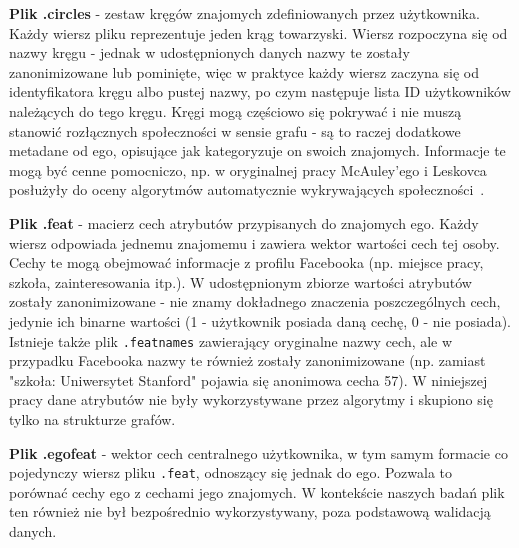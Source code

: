 \textbf{Plik .circles} - zestaw kręgów znajomych zdefiniowanych przez użytkownika. Każdy wiersz pliku reprezentuje jeden krąg towarzyski. Wiersz rozpoczyna się od nazwy kręgu - jednak w udostępnionych danych nazwy te zostały zanonimizowane lub pominięte, więc w praktyce każdy wiersz zaczyna się od identyfikatora kręgu albo pustej nazwy, po czym następuje lista ID użytkowników należących do tego kręgu. Kręgi mogą częściowo się pokrywać i nie muszą stanowić rozłącznych społeczności w sensie grafu - są to raczej dodatkowe metadane od ego, opisujące jak kategoryzuje on swoich znajomych. Informacje te mogą być cenne pomocniczo, np. w oryginalnej pracy McAuley'ego i Leskovca posłużyły do oceny algorytmów automatycznie wykrywających społeczności~\cite{McAuley2012}.

\textbf{Plik .feat} - macierz cech atrybutów przypisanych do znajomych ego. Każdy wiersz odpowiada jednemu znajomemu i zawiera wektor wartości cech tej osoby. Cechy te mogą obejmować informacje z profilu Facebooka (np. miejsce pracy, szkoła, zainteresowania itp.). W udostępnionym zbiorze wartości atrybutów zostały zanonimizowane - nie znamy dokładnego znaczenia poszczególnych cech, jedynie ich binarne wartości (1 - użytkownik posiada daną cechę, 0 - nie posiada). Istnieje także plik \verb|.featnames| zawierający oryginalne nazwy cech, ale w przypadku Facebooka nazwy te również zostały zanonimizowane (np. zamiast "szkoła: Uniwersytet Stanford" pojawia się anonimowa cecha 57). W niniejszej pracy dane atrybutów nie były wykorzystywane przez algorytmy i skupiono się tylko na strukturze grafów.

\textbf{Plik .egofeat} - wektor cech centralnego użytkownika, w tym samym formacie co pojedynczy wiersz pliku \verb|.feat|, odnoszący się jednak do ego. Pozwala to porównać cechy ego z cechami jego znajomych. W kontekście naszych badań plik ten również nie był bezpośrednio wykorzystywany, poza podstawową walidacją danych.

